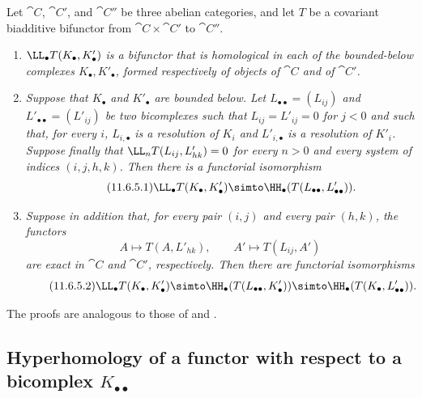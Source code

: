 \begin{proposition}[11.6.5]
\label{0.11.6.5}
Let $\cat{C}$, $\cat{C}'$, and $\cat{C}''$ be three abelian categories, and let $T$ be a covariant biadditive bifunctor from $\cat{C}\times\cat{C}'$ to $\cat{C}''$.
\begin{enumerate}
  \item[{\rm(i)}] \emph{$\LL_\bullet T(K_\bullet,K'_\bullet)$ is a bifunctor that is homological in each of the bounded-below complexes $K_\bullet,K'_\bullet$, formed respectively of objects of $\cat{C}$ and of $\cat{C}'$.}

  \item[{\rm(ii)}] \emph{Suppose that $K_\bullet$ and $K'_\bullet$ are bounded below.
  Let $L_{\bullet\bullet}=(L_{ij})$ and $L'_{\bullet\bullet}=(L'_{ij})$ be two bicomplexes such that $L_{ij}=L'_{ij}=0$ for $j<0$ and such that, for every $i$, $L_{i,\bullet}$ is a resolution of $K_i$ and $L'_{i,\bullet}$ is a resolution of $K'_i$.
  Suppose finally that $\LL_nT(L_{ij},L'_{hk})=0$ for every $n>0$ and every system of indices $(i,j,h,k)$.
  Then there is a functorial isomorphism}
  \[
  \label{0.11.6.5.1}
  \tag{11.6.5.1}
    \LL_\bullet T(K_\bullet,K'_\bullet)
    \simto
    \HH_\bullet(T(L_{\bullet\bullet},L'_{\bullet\bullet})).
  \]

  \item[{\rm(iii)}] \emph{Suppose in addition that, for every pair $(i,j)$ and every pair $(h,k)$, the functors
  \[
    A\longmapsto T(A,L'_{hk}),
    \qquad
    A'\longmapsto T(L_{ij},A')
  \]
  are exact in $\cat{C}$ and $\cat{C}'$, respectively.
  Then there are functorial isomorphisms}
  \[
  \label{0.11.6.5.2}
  \tag{11.6.5.2}
    \LL_\bullet T(K_\bullet,K'_\bullet)
    \simto
    \HH_\bullet(T(L_{\bullet\bullet},K'_\bullet))
    \simto
    \HH_\bullet(T(K_\bullet,L'_{\bullet\bullet})).
  \]
\end{enumerate}

The proofs are analogous to those of  and .
\end{proposition}

\subsection{Hyperhomology of a functor with respect to a bicomplex $K_{\bullet\bullet}$}
\label{subsection:0.11.7}

